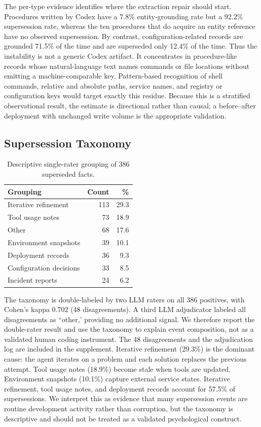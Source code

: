 \documentclass[sigconf,nonacm]{acmart}
\begin{document}
The per-type evidence identifies where the extraction repair should start. Procedures written by Codex have a 7.8\% entity-grounding rate but a 92.2\% supersession rate, whereas the ten procedures that do acquire an entity reference have no observed supersession. By contrast, configuration-related records are grounded 71.5\% of the time and are superseded only 12.4\% of the time. Thus the instability is not a generic Codex artifact. It concentrates in procedure-like records whose natural-language text names commands or file locations without emitting a machine-comparable key. Pattern-based recognition of shell commands, relative and absolute paths, service names, and registry or configuration keys would target exactly this residue. Because this is a stratified observational result, the estimate is directional rather than causal; a before--after deployment with unchanged write volume is the appropriate validation.


\subsection{Supersession Taxonomy}
\label{sec:taxonomy}

\begin{table}[h]
\centering
\caption{Descriptive single-rater grouping of 386 superseded facts.}
\label{tab:taxonomy}
\begin{tabular}{lrr}
\toprule
Grouping & Count & \% \\
\midrule
Iterative refinement & 113 & 29.3 \\
Tool usage notes & 73 & 18.9 \\
Other & 68 & 17.6 \\
Environment snapshots & 39 & 10.1 \\
Deployment records & 36 & 9.3 \\
Configuration decisions & 33 & 8.5 \\
Incident reports & 24 & 6.2 \\
\bottomrule
\end{tabular}
\end{table}

The taxonomy is double-labeled by two LLM raters on all 386 positives, with Cohen's kappa 0.702 (48 disagreements). A third LLM adjudicator labeled all disagreements as ``other,' providing no additional signal. We therefore report the double-rater result and use the taxonomy to explain event composition, not as a validated human coding instrument. The 48 disagreements and the adjudication log are included in the supplement. Iterative refinement (29.3\%) is the dominant cause: the agent iterates on a problem and each solution replaces the previous attempt. Tool usage notes (18.9\%) become stale when tools are updated. Environment snapshots (10.1\%) capture external service states. Iterative refinement, tool usage notes, and deployment records account for 57.5\% of supersessions. We interpret this as evidence that many supersession events are routine development activity rather than corruption, but the taxonomy is descriptive and should not be treated as a validated psychological construct.
\end{document}
